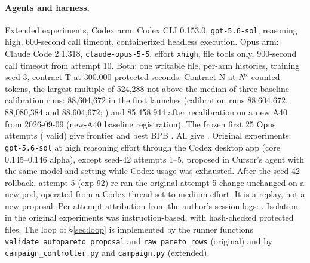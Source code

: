 \documentclass{article}
\begin{document}
\paragraph{Agents and harness.} Extended experiments, Codex arm: Codex CLI 0.153.0, \texttt{gpt-5.6-sol}, reasoning high, 600-second call timeout, containerized headless execution. Opus arm: Claude Code 2.1.318, \texttt{claude-opus-5-5}, effort \texttt{xhigh}, file tools only, 900-second call timeout from attempt 10. Both: one writable file, per-arm histories, training seed 3, contract T at 300.000 protected seconds. Contract N at $N^\star$ counted tokens, the largest multiple of 524,288 not above the median of three baseline calibration runs: 88,604,672 in the first launches (calibration runs 88,604,672, 88,080,384 and 88,604,672; ) and 85,458,944 after recalibration on a new A40 from 2026-09-09 (new-A40 baseline registration). The frozen first 25 Opus attempts (\CROpValidFrozen{} valid) give frontier \CROpFrontierFrozen{} and best BPB \CROpBestFrozen. All \CROpAttempts{} give \CROpFrontierExtended. Original experiments: \texttt{gpt-5.6-sol} at high reasoning effort through the Codex desktop app (core 0.145--0.146 alpha), except seed-42 attempts 1--5, proposed in Cursor's agent with the same model and setting while Codex usage was exhausted. After the seed-42 rollback, attempt 5 (exp 92) re-ran the original attempt-5 change unchanged on a new pod, operated from a Codex thread set to medium effort. It is a replay, not a new proposal. Per-attempt attribution from the author's session logs: . Isolation in the original experiments was instruction-based, with hash-checked protected files. The loop of \S\ref{sec:loop} is implemented by the runner functions \texttt{validate\_autopareto\_proposal} and \texttt{raw\_pareto\_rows} (original) and by \texttt{campaign\_controller.py} and \texttt{campaign.py} (extended).
\end{document}

